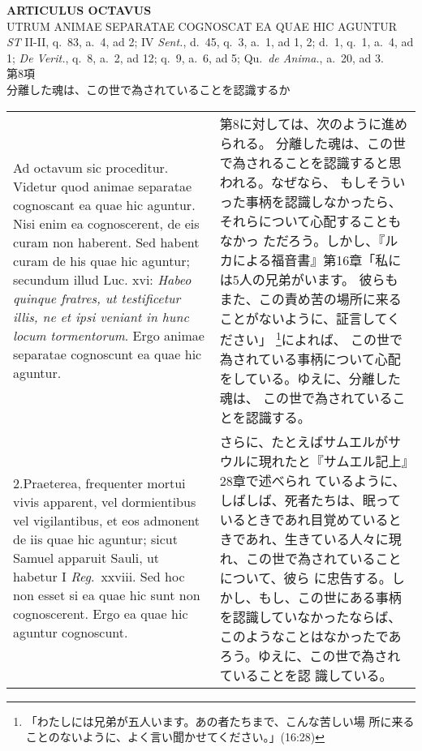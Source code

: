 \documentclass[10pt]{jsarticle} %
\begin{document}
\newpage
{}

\begin{center}
 {\Large {\bf ARTICULUS OCTAVUS}}\\
 {\large UTRUM ANIMAE SEPARATAE COGNOSCAT EA QUAE HIC AGUNTUR}\\
 {\footnotesize {\it ST} II-II, q.~83, a.~4, ad 2; IV {\it Sent.},
 d.~45, q.~3, a.~1, ad 1, 2; d.~1, q.~1, a.~4, ad 1; {\it De Verit.},
 q.~8, a.~2, ad 12; q.~9, a.~6, ad 5; Qu.~{\it de Anima.}, a.~20, ad 3.}\\
 {\Large 第8項\\分離した魂は、この世で為されていることを認識するか}
\end{center}

\begin{longtable}{p{21em}p{21em}}


{\huge A}{\sc d octavum sic proceditur}. Videtur quod animae separatae
 cognoscant ea quae hic aguntur. Nisi enim ea cognoscerent, de eis curam
 non haberent. Sed habent curam de his quae hic aguntur; secundum illud
 Luc. {\sc xvi}: {\it Habeo quinque fratres, ut testificetur illis, ne
 et ipsi veniant in hunc locum tormentorum}. Ergo animae separatae
 cognoscunt ea quae hic aguntur.

&
第8に対しては、次のように進められる。
分離した魂は、この世で為されることを認識すると思われる。なぜなら、
もしそういった事柄を認識しなかったら、それらについて心配することもなかっ
 ただろう。しかし、『ルカによる福音書』第16章「私には5人の兄弟がいます。
 彼らもまた、この責め苦の場所に来ることがないように、証言してください」
 \footnote{「わたしには兄弟が五人います。あの者たちまで、こんな苦しい場
 所に来ることのないように、よく言い聞かせてください。」(16:28)}によれば、
 この世で為されている事柄について心配をしている。ゆえに、分離した魂は、
 この世で為されていることを認識する。

\\




2.{\sc Praeterea}, frequenter mortui vivis
 apparent, vel dormientibus vel vigilantibus, et eos admonent de iis
 quae hic aguntur; sicut Samuel apparuit Sauli, ut habetur I
 {\it Reg}.~{\sc xxviii}. Sed hoc non esset si ea quae hic sunt non
 cognoscerent. Ergo ea quae hic aguntur cognoscunt.

&

さらに、たとえばサムエルがサウルに現れたと『サムエル記上』28章で述べられ
 ているように、しばしば、死者たちは、眠っているときであれ目覚めていると
 きであれ、生きている人々に現れ、この世で為されていることについて、彼ら
 に忠告する。しかし、もし、この世にある事柄を認識していなかったならば、
 このようなことはなかったであろう。ゆえに、この世で為されていることを認
 識している。


\end{longtable}
\end{document}
